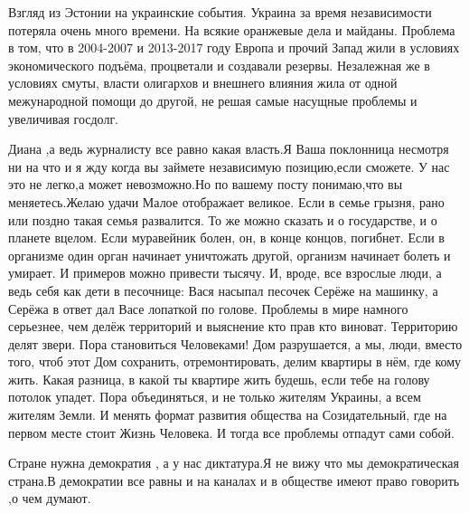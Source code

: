 \begin{itemize}
Взгляд из Эстонии на украинские события. Украина за время независимости
потеряла очень много времени. На всякие оранжевые дела и майданы. Проблема в
том, что в 2004-2007 и 2013-2017 году Европа и прочий Запад жили в условиях
экономического подъёма, процветали и создавали резервы. Незалежная же в
условиях смуты, власти олигархов и внешнего влияния жила от одной межународной
помощи до другой, не решая самые насущные проблемы и увеличивая госдолг.

Диана ,а ведь журналисту все равно какая власть.Я Ваша поклонница несмотря ни
на что и я жду когда вы займете независимую позицию,если сможете. У нас это не
легко,а может невозможно.Но по вашему посту понимаю,что вы меняетесь.Желаю
удачи
Малое отображает великое. Если в семье грызня, рано или поздно такая семья
развалится. То же можно сказать и о государстве, и о планете вцелом. Если
муравейник болен, он, в конце концов, погибнет. Если в организме один орган
начинает уничтожать другой, организм начинает болеть и умирает. И примеров
можно привести тысячу. И, вроде, все взрослые люди, а ведь себя как дети в
песочнице: Вася насыпал песочек Серёже на машинку, а Серёжа в ответ дал Васе
лопаткой по голове. 
Проблемы в мире намного серьезнее, чем делёж территорий и выяснение кто прав
кто виноват. Территорию делят звери. Пора становиться Человеками! Дом
разрушается, а мы, люди, вместо того, чтоб этот Дом сохранить, отремонтировать,
делим квартиры в нём, где кому жить. Какая разница, в какой ты квартире жить
будешь, если тебе на голову потолок упадет. 
Пора объединяться, и не только жителям Украины, а всем жителям Земли. И менять
формат развития общества на Созидательный, где на первом месте стоит Жизнь
Человека. И тогда все проблемы отпадут сами собой.

Стране нужна демократия , а у нас диктатура.Я не вижу что мы демократическая
страна.В демократии все равны и на каналах и в обществе имеют право говорить ,о
чем думают.


\end{itemize}
